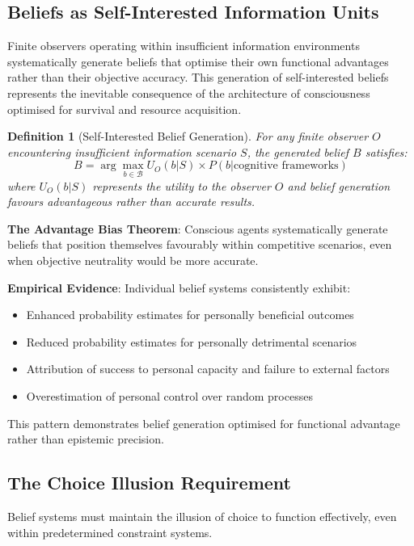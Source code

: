 \documentclass[12pt,a4paper]{article}
\newtheorem{definition}{Definition}
\begin{document}
\subsection{Beliefs as Self-Interested Information Units}

Finite observers operating within insufficient information environments systematically generate beliefs that optimise their own functional advantages rather than their objective accuracy. This generation of self-interested beliefs represents the inevitable consequence of the architecture of consciousness optimised for survival and resource acquisition.

\begin{definition}[Self-Interested Belief Generation]
For any finite observer $O$ encountering insufficient information scenario $S$, the generated belief $B$ satisfies:
$$B = \arg\max_{b \in \mathcal{B}} U_O(b|S) \times P(b|\text{cognitive frameworks})$$
where $U_O(b|S)$ represents the utility to the observer $O$ and belief generation favours advantageous rather than accurate results.
\end{definition}

\textbf{The Advantage Bias Theorem}: Conscious agents systematically generate beliefs that position themselves favourably within competitive scenarios, even when objective neutrality would be more accurate.

\textbf{Empirical Evidence}: Individual belief systems consistently exhibit:
\begin{itemize}
\item Enhanced probability estimates for personally beneficial outcomes
\item Reduced probability estimates for personally detrimental scenarios  
\item Attribution of success to personal capacity and failure to external factors
\item Overestimation of personal control over random processes
\end{itemize}

This pattern demonstrates belief generation optimised for functional advantage rather than epistemic precision.

\subsection{The Choice Illusion Requirement}

Belief systems must maintain the illusion of choice to function effectively, even within predetermined constraint systems.
\end{document}
